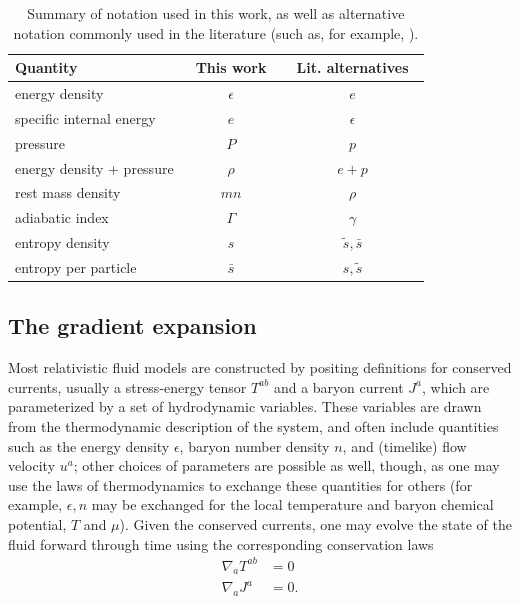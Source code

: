 \documentclass[%
notitlepage,
superscriptaddress,
nofootinbib,
amsmath,
amssymb,
aps,
twocolumn
]{revtex4-1}
\begin{document}
\begin{table}[h]
\begin{tabular}{l|c|c}
Quantity & ~This work~    & ~Lit. alternatives~ \\ \hline
energy density            & $\epsilon$ & $e$ \\
specific internal energy  & $e$        & $\epsilon$ \\
pressure                  & $P$        & $p$ \\
energy density + pressure & $\rho$     & $e+p$ \\
rest mass density         & $m n$      & $\rho$ \\
adiabatic index           & $\Gamma$   & $\gamma$ \\
entropy density           & $s$        & $\tilde{s}, \bar{s}$ \\
entropy per particle      & $\bar{s}$  & $s, \tilde{s}$ \\
\hline
\end{tabular}
\caption{Summary of notation used in this work, as well as alternative notation commonly used in the literature (such as, for example, \cite{Rezzolla2013}). \label{table:notation}}
\end{table}

\subsection{The gradient expansion}

Most relativistic fluid models are constructed by positing definitions for conserved currents, usually a stress-energy tensor $T^{ab}$ and a baryon current $J^{a}$, which are parameterized by a set of hydrodynamic variables.  These variables are drawn from the thermodynamic description of the system, and often include quantities such as the energy density $\epsilon$, baryon number density $n$, and (timelike) flow velocity $u^{a}$; other choices of parameters are possible as well, though, as one may use the laws of thermodynamics to exchange these quantities for others (for example, $\epsilon, n$ may be exchanged for the local temperature and baryon chemical potential, $T$ and $\mu$).  Given the conserved currents, one may evolve the state of the fluid forward through time using the corresponding conservation laws
\begin{align}
\nabla_{a} T^{ab} &= 0 \label{eq:Tab_cons_law} \\
\nabla_{a} J^{a}  &= 0. \label{eq:Ja_cons_law}
\end{align}
\end{document}
